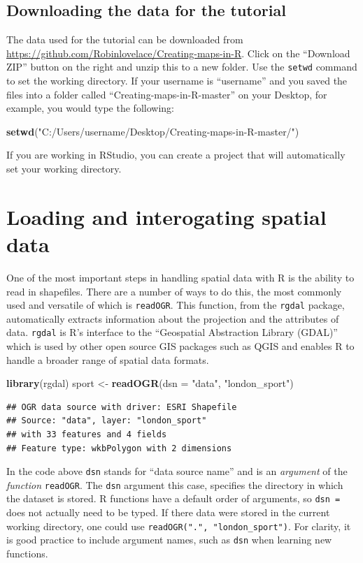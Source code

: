 \documentclass[]{article}
\newenvironment{Shaded}{}{}
\newcommand{\KeywordTok}[1]{\textcolor[rgb]{0.00,0.44,0.13}{\textbf{{#1}}}}
\newcommand{\DataTypeTok}[1]{\textcolor[rgb]{0.56,0.13,0.00}{{#1}}}
\newcommand{\StringTok}[1]{\textcolor[rgb]{0.25,0.44,0.63}{{#1}}}
\newcommand{\NormalTok}[1]{{#1}}
\begin{document}
\subsection{Downloading the data for the tutorial}

The data used for the tutorial can be downloaded from
\href{https://github.com/Robinlovelace/Creating-maps-in-R}{https://github.com/Robinlovelace/Creating-maps-in-R}.
Click on the ``Download ZIP'' button on the right and unzip this to a
new folder. Use the \texttt{setwd} command to set the working directory.
If your username is ``username'' and you saved the files into a folder
called ``Creating-maps-in-R-master'' on your Desktop, for example, you
would type the following:

\begin{Shaded}
\begin{Highlighting}[]
\KeywordTok{setwd}\NormalTok{(}\StringTok{"C:/Users/username/Desktop/Creating-maps-in-R-master/"}\NormalTok{)}
\end{Highlighting}
\end{Shaded}
If you are working in RStudio, you can create a project that will
automatically set your working directory.

\section{Loading and interogating spatial data}

One of the most important steps in handling spatial data with R is the
ability to read in shapefiles. There are a number of ways to do this,
the most commonly used and versatile of which is \texttt{readOGR}. This
function, from the \texttt{rgdal} package, automatically extracts
information about the projection and the attributes of data.
\texttt{rgdal} is R's interface to the ``Geospatial Abstraction Library
(GDAL)'' which is used by other open source GIS packages such as QGIS
and enables R to handle a broader range of spatial data formats.

\begin{Shaded}
\begin{Highlighting}[]
\KeywordTok{library}\NormalTok{(rgdal)}
\NormalTok{sport <- }\KeywordTok{readOGR}\NormalTok{(}\DataTypeTok{dsn =} \StringTok{"data"}\NormalTok{, }\StringTok{"london_sport"}\NormalTok{)}
\end{Highlighting}
\end{Shaded}
\begin{verbatim}
## OGR data source with driver: ESRI Shapefile 
## Source: "data", layer: "london_sport"
## with 33 features and 4 fields
## Feature type: wkbPolygon with 2 dimensions
\end{verbatim}
In the code above \texttt{dsn} stands for ``data source name'' and is an
\emph{argument} of the \emph{function} \texttt{readOGR}. The
\texttt{dsn} argument this case, specifies the directory in which the
dataset is stored. R functions have a default order of arguments, so
\texttt{dsn =} does not actually need to be typed. If there data were
stored in the current working directory, one could use
\texttt{readOGR(".", "london\_sport")}. For clarity, it is good practice
to include argument names, such as \texttt{dsn} when learning new
functions.
\end{document}
